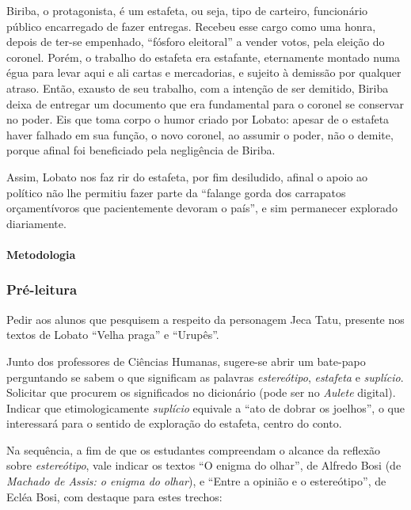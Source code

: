 \documentclass[11pt]{extarticle}
\begin{document}
Biriba, o protagonista, é um estafeta, ou seja, tipo de carteiro,
funcionário público encarregado de fazer entregas. Recebeu esse cargo
como uma honra, depois de ter-se empenhado, ``fósforo eleitoral'' a
vender votos, pela eleição do coronel. Porém, o trabalho do estafeta era
estafante, eternamente montado numa égua para levar aqui e ali cartas e
mercadorias, e sujeito à demissão por qualquer atraso. Então, exausto de
seu trabalho, com a intenção de ser demitido, Biriba deixa de entregar
um documento que era fundamental para o coronel se conservar no poder.
Eis que toma corpo o humor criado por Lobato: apesar de o estafeta haver
falhado em sua função, o novo coronel, ao assumir o poder, não o demite,
porque afinal foi beneficiado pela negligência de Biriba.

Assim, Lobato nos faz rir do estafeta, por fim desiludido, afinal o
apoio ao político não lhe permitiu fazer parte da ``falange gorda dos
carrapatos orçamentívoros que pacientemente devoram o país'', e sim
permanecer explorado diariamente.

\paragraph{Metodologia}

\subsubsection{Pré-leitura}


Pedir aos alunos que pesquisem a respeito da personagem Jeca Tatu,
presente nos textos de Lobato ``Velha praga'' e ``Urupês''.

Junto dos professores de Ciências Humanas, sugere-se abrir um bate-papo perguntando
se sabem o que significam as palavras
\emph{estereótipo}, \emph{estafeta} e \emph{suplício}. Solicitar que
procurem os significados no dicionário (pode ser no \emph{Aulete}
digital). Indicar que etimologicamente \emph{suplício} equivale a ``ato
de dobrar os joelhos'', o que interessará para o sentido de exploração
do estafeta, centro do conto.

Na sequência, a fim de que os estudantes compreendam o alcance da
reflexão sobre \emph{estereótipo}, vale indicar os textos ``O enigma do
olhar'', de Alfredo Bosi (de \emph{Machado de Assis: o enigma do
olhar}), e ``Entre a opinião e o estereótipo'', de Ecléa Bosi, com
destaque para estes trechos:
\end{document}
